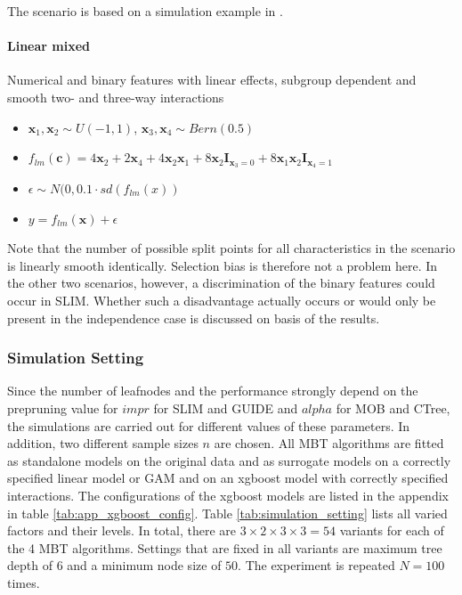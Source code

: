 The scenario is based on a simulation example in \citep{Herbinger.2022}.

\paragraph{Linear mixed}
Numerical and binary features with linear effects, subgroup dependent and smooth two- and three-way interactions
\begin{itemize}
    \item $\textbf{x}_1, \textbf{x}_2 \sim U(-1,1)$, $\textbf{x}_3, \textbf{x}_4 \sim Bern(0.5)$
    \item $f_{lm}(\textbf{c}) = 4   \textbf{x}_2 + 2   \textbf{x}_4  + 4   \textbf{x}_2   \textbf{x}_1 + 8   \textbf{x}_2   \mathbf{I}_{\textbf{x}_3 = 0} +  8 \textbf{x}_1   \textbf{x}_2 \mathbf{I}_{\textbf{x}_4 = 1}$
    \item $\epsilon \sim N(0, 0.1 \cdot sd(f_{lm}(x))$
    \item $y = f_{lm}(\textbf{x}) + \epsilon$
\end{itemize}

Note that the number of possible split points for all characteristics in the scenario is linearly smooth identically. Selection bias is therefore not a problem here.
In the other two scenarios, however, a discrimination of the binary features could occur in SLIM. Whether such a disadvantage actually occurs or would only be present in the independence case is discussed on basis of the results.


\subsubsection{Simulation Setting}
Since the number of leafnodes and the performance strongly depend on the prepruning value for $impr$ for SLIM and GUIDE and $alpha$ for MOB and CTree, the simulations are carried out for different values of these parameters. In addition, two different sample sizes $n$ are chosen. 
All MBT algorithms are fitted as standalone models on the original data and as surrogate models on a correctly specified linear model or GAM and on an xgboost model with correctly specified interactions. The configurations of the xgboost models are listed in the appendix in table \ref{tab:app_xgboost_config}.
Table \ref{tab:simulation_setting} lists all varied factors and their levels. In total, there are $3 \times 2 \times 3 \times 3 = 54$ variants for each of the 4 MBT algorithms.
Settings that are fixed in all variants are maximum tree depth of $6$ and a minimum node size of $50$.
The experiment is repeated $N = 100$ times.

